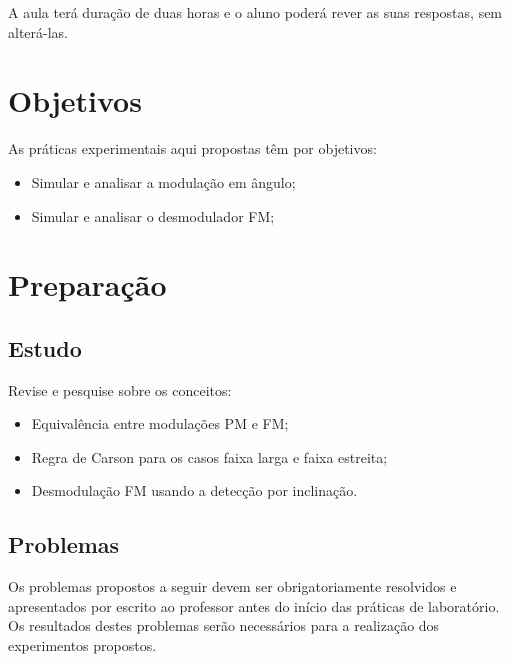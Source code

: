 \documentclass[12pt,addpoints]{exam}
\begin{document}
A aula terá duração de duas horas e o aluno poderá rever as suas respostas, sem alterá-las. %

\section{Objetivos}

As práticas experimentais aqui propostas têm por objetivos:
\begin{itemize}
    \item Simular e analisar a modulação em ângulo;
    \item Simular e analisar o desmodulador FM;
\end{itemize}

\section{Preparação} \label{sect:Preparacao}

\subsection{Estudo}

Revise e pesquise sobre os conceitos:
\begin{itemize}
    \item Equivalência entre modulações PM e FM;
    \item Regra de Carson para os casos faixa larga e faixa estreita;
    \item Desmodulação FM usando a detecção por inclinação.
\end{itemize}

\subsection{Problemas}

Os problemas propostos a seguir devem ser obrigatoriamente resolvidos e apresentados por escrito ao professor antes do início das práticas de laboratório. Os resultados destes problemas serão necessários para a realização dos experimentos propostos. 
\end{document}
